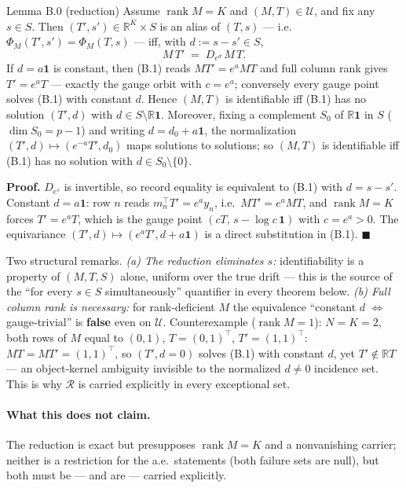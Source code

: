\begin{namedthm}{Lemma B.0 (reduction)}
Assume $\operatorname{rank}M=K$ and $(M,T)\in\mathcal U$, and fix any $s\in S$. Then $(T',s')\in\mathbb R^K\times S$ is an alias of $(T,s)$ --- i.e.\ $\Phi_M(T',s')=\Phi_M(T,s)$ --- iff, with $d:=s-s'\in S$,
\begin{equation}
M\,T'\;=\;D_{e^{d}}\,M\,T.
\tag{B.1}
\end{equation}
If $d=a\mathbf 1$ is constant, then (B.1) reads $MT'=e^{a}MT$ and full column rank gives $T'=e^{a}T$ --- exactly the gauge orbit with $c=e^{a}$; conversely every gauge point solves (B.1) with constant $d$. Hence $(M,T)$ is identifiable iff (B.1) has no solution $(T',d)$ with $d\in S\setminus\mathbb R\mathbf 1$. Moreover, fixing a complement $S_0$ of $\mathbb R\mathbf 1$ in $S$ ($\dim S_0=p-1$) and writing $d=d_0+a\mathbf 1$, the normalization $(T',d)\mapsto(e^{-a}T',d_0)$ maps solutions to solutions; so $(M,T)$ is identifiable iff (B.1) has no solution with $d\in S_0\setminus\{0\}$.
\end{namedthm}

\noindent\textbf{Proof.} $D_{e^{s}}$ is invertible, so record equality is equivalent to (B.1) with $d=s-s'$. Constant $d=a\mathbf 1$: row $n$ reads $m_n^\top T'=e^{a}y_n$, i.e.\ $MT'=e^{a}MT$, and $\operatorname{rank}M=K$ forces $T'=e^{a}T$, which is the gauge point $(cT,\,s-\log c\,\mathbf 1)$ with $c=e^{a}>0$. The equivariance $(T',d)\mapsto(e^{a}T',d+a\mathbf 1)$ is a direct substitution in (B.1). \hfill$\blacksquare$

Two structural remarks. \emph{(a) The reduction eliminates $s$:} identifiability is a property of $(M,T,S)$ alone, uniform over the true drift --- this is the source of the ``for every $s\in S$ simultaneously'' quantifier in every theorem below. \emph{(b) Full column rank is necessary:} for rank-deficient $M$ the equivalence ``constant $d$ $\Leftrightarrow$ gauge-trivial'' is \textbf{false} even on $\mathcal U$. Counterexample ($\operatorname{rank}M=1$): $N=K=2$, both rows of $M$ equal to $(0,1)$, $T=(0,1)^\top$, $T'=(1,1)^\top$: $MT=MT'=(1,1)^\top$, so $(T',d=0)$ solves (B.1) with constant $d$, yet $T'\notin\mathbb R T$ --- an object-kernel ambiguity invisible to the normalized $d\neq0$ incidence set. This is why $\mathcal R$ is carried explicitly in every exceptional set.

\paragraph{What this does not claim.} The reduction is exact but presupposes $\operatorname{rank}M=K$ and a nonvanishing carrier; neither is a restriction for the a.e.\ statements (both failure sets are null), but both must be --- and are --- carried explicitly.

